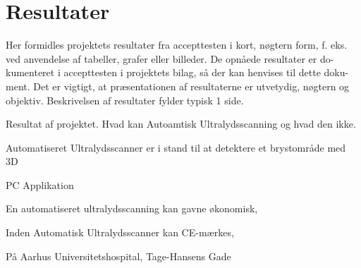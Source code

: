 \chapter{Resultater}\label{kapitel_Resultater}

Her formidles projektets resultater fra accepttesten i kort, nøgtern form, f. eks. ved anvendelse af tabeller, grafer eller billeder. De opnåede resultater er do-kumenteret i accepttesten i projektets bilag, så der kan henvises til dette doku-ment. Det er vigtigt, at præsentationen af resultaterne er utvetydig, nøgtern og objektiv. Beskrivelsen af resultater fylder typisk 1 side.

Resultat af projektet. Hvad kan Autoamtisk Ultralydsscanning og hvad den ikke. 

Automatiseret Ultralydsscanner er i stand til at detektere et brystområde med 3D 

PC Applikation 

En automatiseret ultralydsscanning kan gavne økonomisk, 

Inden Automatisk Ultralydsscanner kan CE-mærkes,

På Aarhus Universitetshospital, Tage-Hansens Gade 


